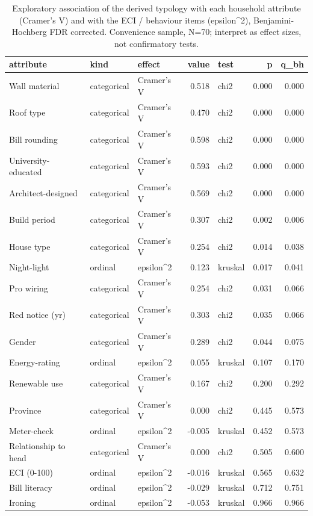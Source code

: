 \begin{table}
\caption{Exploratory association of the derived typology with each household attribute (Cramer's V) and with the ECI / behaviour items (epsilon^2), Benjamini-Hochberg FDR corrected. Convenience sample, N=70; interpret as effect sizes, not confirmatory tests.}
\label{tab:cluster_effects}
\begin{tabular}{lllrlrr}
\toprule
attribute & kind & effect & value & test & p & q\_bh \\
\midrule
Wall material & categorical & Cramer's V & 0.518 & chi2 & 0.000 & 0.000 \\
Roof type & categorical & Cramer's V & 0.470 & chi2 & 0.000 & 0.000 \\
Bill rounding & categorical & Cramer's V & 0.598 & chi2 & 0.000 & 0.000 \\
University-educated & categorical & Cramer's V & 0.593 & chi2 & 0.000 & 0.000 \\
Architect-designed & categorical & Cramer's V & 0.569 & chi2 & 0.000 & 0.000 \\
Build period & categorical & Cramer's V & 0.307 & chi2 & 0.002 & 0.006 \\
House type & categorical & Cramer's V & 0.254 & chi2 & 0.014 & 0.038 \\
Night-light & ordinal & epsilon\textasciicircum 2 & 0.123 & kruskal & 0.017 & 0.041 \\
Pro wiring & categorical & Cramer's V & 0.254 & chi2 & 0.031 & 0.066 \\
Red notice (yr) & categorical & Cramer's V & 0.303 & chi2 & 0.035 & 0.066 \\
Gender & categorical & Cramer's V & 0.289 & chi2 & 0.044 & 0.075 \\
Energy-rating & ordinal & epsilon\textasciicircum 2 & 0.055 & kruskal & 0.107 & 0.170 \\
Renewable use & categorical & Cramer's V & 0.167 & chi2 & 0.200 & 0.292 \\
Province & categorical & Cramer's V & 0.000 & chi2 & 0.445 & 0.573 \\
Meter-check & ordinal & epsilon\textasciicircum 2 & -0.005 & kruskal & 0.452 & 0.573 \\
Relationship to head & categorical & Cramer's V & 0.000 & chi2 & 0.505 & 0.600 \\
ECI (0-100) & ordinal & epsilon\textasciicircum 2 & -0.016 & kruskal & 0.565 & 0.632 \\
Bill literacy & ordinal & epsilon\textasciicircum 2 & -0.029 & kruskal & 0.712 & 0.751 \\
Ironing & ordinal & epsilon\textasciicircum 2 & -0.053 & kruskal & 0.966 & 0.966 \\
\bottomrule
\end{tabular}
\end{table}
